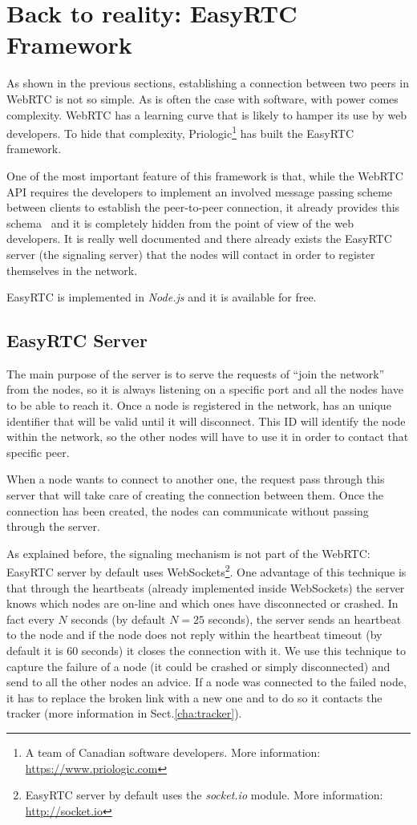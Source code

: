 \section{Back to reality: EasyRTC Framework}
\label{sec:easy_tc}
As shown in the previous sections, establishing a connection between two peers in WebRTC is not so simple.
As is often the case with software, with power comes complexity. WebRTC has a learning curve that is likely to hamper its use by web developers. To hide that complexity, Priologic\footnote{A team of Canadian software developers. More information: \url{https://www.priologic.com}} has built the EasyRTC framework.

One of the most important feature of this framework is that, while the WebRTC API requires the developers to implement an involved message passing scheme between clients to establish the peer-to-peer connection, it already provides this schema~\cite{easyrtc} and it is completely hidden from the point of view of the web developers. It is really well documented and there already exists the EasyRTC server (the signaling server) that the nodes will contact in order to register themselves in the network.

EasyRTC is implemented in \textit{Node.js} and it is available for free.

\subsection{EasyRTC Server}
\label{subsec:easyrtc_server}

The main purpose of the server is to serve the requests of ``join the network'' from the nodes, so it is always listening on a specific port and all the nodes have to be able to reach it. Once a node is registered in the network, has an unique identifier that will be valid until it will disconnect. This ID will identify the node within the network, so the other nodes will have to use it in order to contact that specific peer. 

When a node wants to connect to another one, the request pass through this server that will take care of creating the connection between them. Once the connection has been created, the nodes can communicate without passing through the server. 

As explained before, the signaling mechanism is not part of the WebRTC: EasyRTC server by default uses WebSockets\footnote{EasyRTC server by default uses the \emph{socket.io} module. More information: \url{http://socket.io}}. One advantage of this technique is that through the heartbeats (already implemented inside WebSockets) the server knows which nodes are on-line and which ones have disconnected or crashed. In fact every $N$ seconds (by default $N = 25$ seconds), the server sends an heartbeat to the node and if the node does not reply within the heartbeat timeout (by default it is $60$ seconds) it closes the connection with it. We use this technique to capture the failure of a node (it could be crashed or simply disconnected) and send to all the other nodes an advice. If a node was connected to the failed node, it has to replace the broken link with a new one and to do so it contacts the tracker (more information in Sect.\ref{cha:tracker}).


